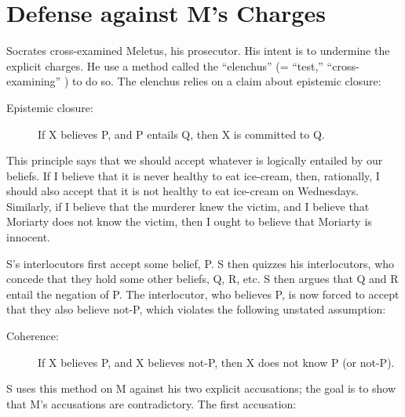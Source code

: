 \documentclass[oneside]{article}
\begin{document}



\section*{Defense against M's Charges}
Socrates cross-examined Meletus, his prosecutor. His intent is to undermine the explicit charges.  He use a method called the ``elenchus'' (= ``test,'' ``cross-examining'' ) to do so. The elenchus relies on a claim about epistemic closure: 

\begin{description}
\item[Epistemic closure:] If X believes P, and P entails Q, then X is committed to Q.
\end{description}
This principle says that we should accept whatever is logically entailed by our beliefs. If I believe that it is never healthy to eat ice-cream, then, rationally, I should also accept that it is not healthy to eat ice-cream on Wednesdays. Similarly, if I believe that the murderer knew the victim, and I believe that Moriarty does not know the victim, then I ought to believe that Moriarty is innocent. 

S's interlocutors first accept some belief, P. S then quizzes his interlocutors, who concede that they hold some other beliefs, Q, R, etc. S then argues that Q and R entail the negation of P. The interlocutor, who believes P, is now forced to accept that they also believe not-P, which violates the following unstated assumption: 
\begin{description}
\item[Coherence:] If X believes P, and X believes not-P, then X does not know P (or not-P). 
\end{description}
S uses this method on M against his two explicit accusations; the goal is to show that M's accusations are contradictory. The first accusation: 
\end{document}
